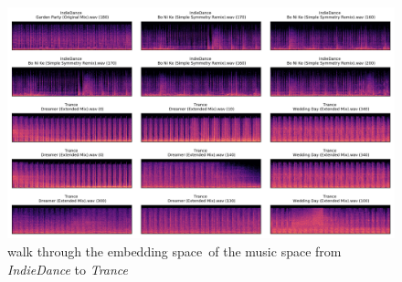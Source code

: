 \begin{figure}[ht]
\centering
    \includegraphics[width=0.9\linewidth]{img/Walk_through_music_space.png}
    \caption{\flqq walk through the embedding space\frqq \ of the music space from \textit{IndieDance} to \textit{Trance}}
    \label{fig:Walk-through-Music}
\end{figure}

